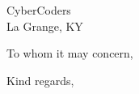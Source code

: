 \documentclass[]{letter}
\newcommand{\companyname}{CyberCoders}
\newcommand{\city}{La Grange}
\newcommand{\stateshort}{KY}
\newcommand{\zipcode}{}
\begin{document}
	
	\begin{letter}{\companyname{} \\
			\city{}, \stateshort{} \zipcode{}
			
			
		}
		\address{8404 Glaser Ln \\ Louisville, KY 40291}
		
		\opening{To whom it may concern,}
		
		
		
		 
		
		 
		
		 
		
		
		
		
		
		\signature{Jacob Archambault}
		
		\closing{Kind regards,}
		
		
	\end{letter}
\end{document}

